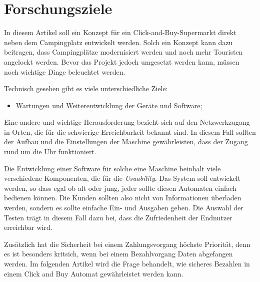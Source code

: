\section{Forschungsziele}


In diesem Artikel soll ein Konzept für ein Click-and-Buy-Supermarkt direkt neben dem Campingplatz 
entwickelt werden. Solch ein Konzept kann dazu beitragen, dass Campingplätze modernisiert werden 
und noch mehr Touristen angelockt werden. Bevor das Projekt jedoch umgesetzt werden kann, müssen 
noch wichtige Dinge beleuchtet werden. 

Technisch gesehen gibt es viele unterschiedliche Ziele:
\begin{itemize}
    \item Wartungen und Weiterentwicklung der Geräte und Software;
\end{itemize}

Eine andere und wichtige Herausforderung bezieht sich auf den Netzwerkzugang in Orten, die für die schwierige 
Erreichbarkeit bekannt sind. In diesem Fall sollten der Aufbau und die Einstellungen der Maschine gewährleisten,
dass der Zugang rund um die Uhr funktioniert.

Die Entwicklung einer Software für solche eine Maschine beinhalt viele verschiedene Komponenten, die für die
\textit{Usuability}. Das System soll entwickelt werden, so dass egal ob alt oder jung, jeder sollte diesen 
Automaten einfach bedienen können. Die Kunden sollten also nicht von Informationen überladen werden, 
sondern es sollte einfache Ein- und Ausgaben geben. Die Auswahl der Testen trägt in diesem Fall dazu bei,
dass die Zufriedenheit der Endnutzer erreichbar wird.


Zusätzlich hat die Sicherheit bei einem Zahlungsvorgang höchste Priorität, denn es ist besonders kritsich, 
wenn bei einem Bezahlvorgang Daten abgefangen werden. Im folgenden Artikel wird die Frage behandelt, 
wie sicheres Bezahlen in einem Click and Buy Automat gewährleistet werden kann.
